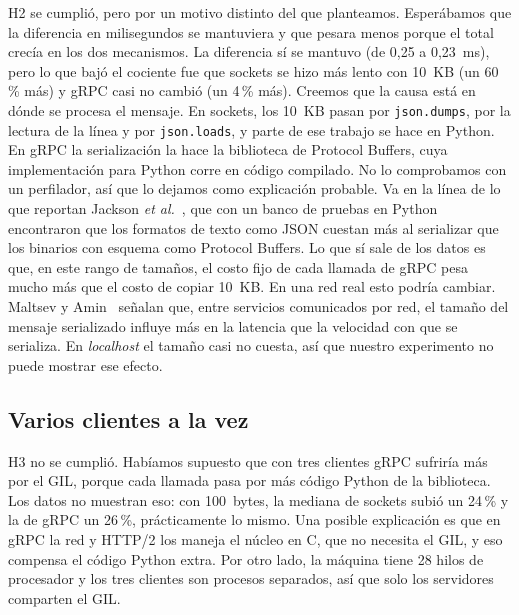 H2 se cumplió, pero por un motivo distinto del que planteamos. Esperábamos que la diferencia en milisegundos se mantuviera y que pesara menos porque el total crecía en los dos mecanismos. La diferencia sí se mantuvo (de 0,25 a 0,23~ms), pero lo que bajó el cociente fue que sockets se hizo más lento con 10~KB (un 60\,\% más) y gRPC casi no cambió (un 4\,\% más). Creemos que la causa está en dónde se procesa el mensaje. En sockets, los 10~KB pasan por \texttt{json.dumps}, por la lectura de la línea y por \texttt{json.loads}, y parte de ese trabajo se hace en Python. En gRPC la serialización la hace la biblioteca de Protocol Buffers, cuya implementación para Python corre en código compilado. No lo comprobamos con un perfilador, así que lo dejamos como explicación probable. Va en la línea de lo que reportan Jackson \emph{et al.}~\cite{Jackson2024}, que con un banco de pruebas en Python encontraron que los formatos de texto como JSON cuestan más al serializar que los binarios con esquema como Protocol Buffers. Lo que sí sale de los datos es que, en este rango de tamaños, el costo fijo de cada llamada de gRPC pesa mucho más que el costo de copiar 10~KB. En una red real esto podría cambiar. Maltsev y Amin~\cite{Maltsev2024} señalan que, entre servicios comunicados por red, el tamaño del mensaje serializado influye más en la latencia que la velocidad con que se serializa. En \emph{localhost} el tamaño casi no cuesta, así que nuestro experimento no puede mostrar ese efecto.

\subsection{Varios clientes a la vez}

H3 no se cumplió. Habíamos supuesto que con tres clientes gRPC sufriría más por el GIL, porque cada llamada pasa por más código Python de la biblioteca. Los datos no muestran eso: con 100~bytes, la mediana de sockets subió un 24\,\% y la de gRPC un 26\,\%, prácticamente lo mismo. Una posible explicación es que en gRPC la red y HTTP/2 los maneja el núcleo en C, que no necesita el GIL, y eso compensa el código Python extra. Por otro lado, la máquina tiene 28 hilos de procesador y los tres clientes son procesos separados, así que solo los servidores comparten el GIL.

